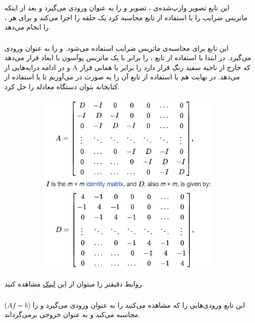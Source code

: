 \documentclass[a4paper,12pt]{article}
\begin{document}
	\subsubsection*{}
	این تابع تصویر وارپ‌شده‌ی 
	،
	تصویر 
	و 
	را به عنوان ورودی می‌گیرد و بعد از اینکه ماتریس ضرایب 
	را با استفاده از تابع 
	 محاسبه کرد یک حلقه را اجرا می‌کند و برای هر 
	 ،
	 را انجام می‌دهد.
	 \subsubsection*{}
	 این تابع برای محاسبه‌ی ماتریس ضرایب استفاده می‌شود. 
	 و 
	 را به عنوان ورودی می‌گیرد. در ابتدا با استفاده از تابع 
	 ،
	 را برابر با یک ماتریس پوآسون با ابعاد 
	  قرار می‌دهد و در ادامه درایه‌هایی از A که خارج از ناحیه سفید رنگِ
	  قرار دارد را برابر با همانی قرار می‌دهد. در نهایت هم با استفاده از تابع 
	  آن را به صورت 
	  در می‌آوریم تا با استفاده از کتابخانه 	  
	  بتوان دستگاه معادله را حل کرد.	
	  \begin{figure}[H]
	  	\centering
	  	\begin{subfigure}{0.6\textwidth}
	  		\centering
	  		\includegraphics[width=.6\textwidth]{2.png}
	  	\end{subfigure}
	  \end{figure}
	  روابط دقیقتر را میتوان از این 
	  \href{https://en.wikipedia.org/wiki/Discrete_Poisson_equation}{لینک}
	  مشاهده کنید.
	 \subsubsection*{}
	 این تابع ورودی‌هایی را که مشاهده می‌کنید را به عنوان ورودی می‌گیرد و 
	 را ($ Af = b $) محاسبه می‌کند و به عنوان خروجی بر‌می‌گرداند.
\end{document}
